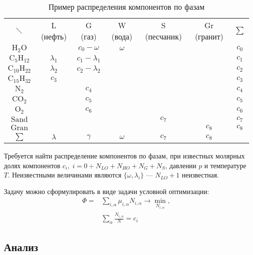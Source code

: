 \documentclass[12pt]{article}
\let\dividesymbol\div
\renewcommand{\div}{\operatorname{div}}
\begin{document}
\begin{table}[ht!]
\centering
\begin{tabular}{c|c|c|c|c|c|c}
\multicolumn{1}{c}{$\diagdown$}&
\multicolumn{1}{c}{L (нефть)}&
\multicolumn{1}{c}{G (газ)}&
\multicolumn{1}{c}{W (вода)}&
\multicolumn{1}{c}{S (песчаник)}&
Gr (гранит)&
$\sum$\\
\cline{2-6}
$\mathrm{H_2O}$& & $c_0 - \omega$ & $\omega$ & & & $c_0$\\
\cline{1-6}
$\mathrm{C_5H_{12}}$& $\lambda_1$ & $c_1 - \lambda_1$ & & & & $c_1$\\
\cline{2-6}
$\mathrm{C_{10}H_{22}}$& $\lambda_2$ & $c_2 - \lambda_2$ & & & & $c_2$\\
\cline{1-6}
$\mathrm{C_{15}H_{32}}$& $c_3$ & & & & & $c_3$\\
\cline{1-6}
$\mathrm{N_2}$& & $c_4$ & & & & $c_4$\\
\cline{2-6}
$\mathrm{CO_2}$& & $c_5$ & & & & $c_5$\\
\cline{2-6}
$\mathrm{O_2}$& & $c_6$ & & & & $c_6$\\
\cline{1-6}
$\mathrm{Sand}$& & & & $c_7$ & & $c_7$\\
\cline{2-6}
$\mathrm{Gran}$& & & & & $c_8$ & $c_8$\\
\cline{1-6}
\multicolumn{1}{c}{$\sum$}&
\multicolumn{1}{c}{$\lambda$}&
\multicolumn{1}{c}{$\gamma$}&
\multicolumn{1}{c}{$\omega$}&
\multicolumn{1}{c}{$c_7$}&
\multicolumn{1}{c}{$c_8$}\\
\end{tabular}
\caption{Пример распределения компонентов по фазам}
\label{t:compphases}
\end{table}

Требуется найти распределение компонентов по фазам, при известных молярных долях компонентов $c_i, \; i = 0 \dividesymbol N_{LO} + N_{HO} + N_{G} + N_{S}$, давлении $p$ и температуре $T$. Неизвестными величинами являются $\{\omega, \lambda_i\}$ --- $N_{LO} + 1$ неизвестная.

Задачу можно сформулировать в виде задачи условной оптимизации:
\begin{equation}
\begin{aligned}
\Phi = &\sum_{i, \alpha} \mu_{i, \alpha} N_{i, \alpha} \rightarrow \min_{N_{i, \alpha}},\\
&\sum_\alpha \frac{N_{i, \alpha}}{N} = c_i
\end{aligned}
\label{eq:problem}
\end{equation}

\subsection{Анализ}
\end{document}
